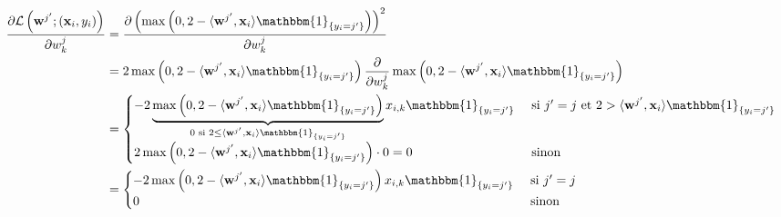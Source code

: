 \documentclass[11pt, french, english]{article}
\def\wkj{w_{k}^{j}}
\begin{document}
\begin{enumerate}
\begin{reponse}
		      \begin{align}
			      \label{eq:derivL}
			      \begin{split}
				      \frac{\partial\mathcal{L}\left(\mathbf{w}^{j^{\prime}}; (\mathbf{x}_i, y_i)\right)}{\partial\wkj}
				      &= \frac{\partial\left(\max\left(0, 2 - \langle \mathbf{w}^{j^{\prime}}, \mathbf{x}_i \rangle\mathbbm{1}_{\{y_i = j^{\prime}\}}\right)\right)^2}{\partial\wkj}\\
				      &= 2\max\left(0, 2 - \langle \mathbf{w}^{j^{\prime}}, \mathbf{x}_i \rangle\mathbbm{1}_{\{y_i = j^{\prime}\}}\right)\frac{\partial}{\partial\wkj}\max\left(0, 2 - \langle \mathbf{w}^{j^{\prime}}, \mathbf{x}_i \rangle\mathbbm{1}_{\{y_i = j^{\prime}\}}\right)\\
				      &= \begin{cases}
					      -2\underbrace{\max\left(0, 2 - \langle \mathbf{w}^{j^{\prime}}, \mathbf{x}_i \rangle\mathbbm{1}_{\{y_i = j^{\prime}\}}\right)}_{0 \text{ si } 2 \leq \langle \mathbf{w}^{j^{\prime}}, \mathbf{x}_i \rangle\mathbbm{1}_{\{y_i = j^{\prime}\}}}x_{i,k}\mathbbm{1}_{\{y_i = j^{\prime}\}} & \text{ si } j^{\prime} = j \text{ et } 2 >\langle \mathbf{w}^{j^{\prime}}, \mathbf{x}_i \rangle\mathbbm{1}_{\{y_i = j^{\prime}\}} \\
					      2\max\left(0, 2 - \langle \mathbf{w}^{j^{\prime}}, \mathbf{x}_i \rangle\mathbbm{1}_{\{y_i = j^{\prime}\}}\right) \cdot 0 = 0                                                                                                                                                           & \text{ sinon }
				      \end{cases}\\
				      &= \begin{cases}
					      -2\max\left(0, 2 - \langle \mathbf{w}^{j^{\prime}}, \mathbf{x}_i \rangle\mathbbm{1}_{\{y_i = j^{\prime}\}}\right)x_{i,k}\mathbbm{1}_{\{y_i = j^{\prime}\}} & \text{ si } j^{\prime} = j \\
					      0                                                                                                                                                          & \text{ sinon }
				      \end{cases}
			      \end{split}
		      \end{align}


\end{reponse}
\end{enumerate}
\end{document}
